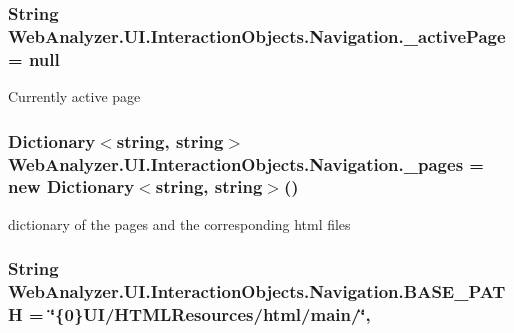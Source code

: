 \subsubsection[{\+\_\+active\+Page}]{\setlength{\rightskip}{0pt plus 5cm}String Web\+Analyzer.\+U\+I.\+Interaction\+Objects.\+Navigation.\+\_\+active\+Page = null\hspace{0.3cm}{\ttfamily [private]}}\label{class_web_analyzer_1_1_u_i_1_1_interaction_objects_1_1_navigation_afd0cf0210ac23b764bf332e97f332ee9}


Currently active page 

\hypertarget{class_web_analyzer_1_1_u_i_1_1_interaction_objects_1_1_navigation_a57f8147fa5872f86185947f634e43c5e}{}
\subsubsection[{\+\_\+pages}]{\setlength{\rightskip}{0pt plus 5cm}Dictionary$<$string, string$>$ Web\+Analyzer.\+U\+I.\+Interaction\+Objects.\+Navigation.\+\_\+pages = new Dictionary$<$string, string$>$()\hspace{0.3cm}{\ttfamily [private]}}\label{class_web_analyzer_1_1_u_i_1_1_interaction_objects_1_1_navigation_a57f8147fa5872f86185947f634e43c5e}


dictionary of the pages and the corresponding html files 

\hypertarget{class_web_analyzer_1_1_u_i_1_1_interaction_objects_1_1_navigation_a2562597149b4eb0542349a2afb17b7e1}{}
\subsubsection[{B\+A\+S\+E\+\_\+\+P\+A\+T\+H}]{\setlength{\rightskip}{0pt plus 5cm}String Web\+Analyzer.\+U\+I.\+Interaction\+Objects.\+Navigation.\+B\+A\+S\+E\+\_\+\+P\+A\+T\+H = \char`\"{}\{0\}U\+I/H\+T\+M\+L\+Resources/html/main/\char`\"{}\hspace{0.3cm}{\ttfamily [static]}, {\ttfamily [private]}}\label{class_web_analyzer_1_1_u_i_1_1_interaction_objects_1_1_navigation_a2562597149b4eb0542349a2afb17b7e1}


